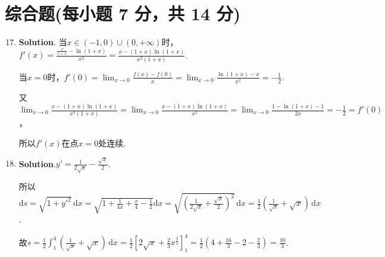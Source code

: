 \documentclass[../Main.tex]{subfiles}
\begin{document}
\section{综合题(每小题 7 分，共 14 分)}
\begin{enumerate}
    \setcounter{enumi}{16}
    \item \textbf{Solution}. 当$x\in(-1,0)\cup(0,+\infty)$时，$f'(x)=\frac{\frac{x}{1+x}-\ln(1+x)}{x^{2}}
              =\frac{x-(1+x)\ln(1+x)}{x^{2}(1+x)}$.

          当$x=0$时，$f'(0)=\lim_{x\to0}\frac{f(x)-f(0)}{x}=\lim_{x\to0}\frac{\ln(1+x)-x}{x^{2}}
              =-\frac{1}{2}$.

          又$\lim_{x\to0}\frac{x-(1+x)\ln(1+x)}{x^{2}(1+x)}=\lim_{x\to0}\frac{x-(1+x)\ln(1+x)}{x^{2}}
              =\lim_{x\to0}\frac{1-\ln(1+x)-1}{2x}=-\frac{1}{2}=f'(0)$，

          所以$f'(x)$在点$x=0$处连续.

    \item \textbf{Solution}.$y'=\frac{1}{2\sqrt{x}}-\frac{\sqrt{x}}{2}$.

          所以$\mathrm{d}s=\sqrt{1+y'^{2}}\,\mathrm{d}x=\sqrt{1+\frac{1}{4x}+\frac{x}{4}-\frac{1}{2}}
              \mathrm{d}x=\sqrt{\left(\frac{1}{2\sqrt{x}}+\frac{\sqrt{x}}{2}\right)^{2}}\,\mathrm{d}
              x=\frac{1}{2}\left(\frac{1}{\sqrt{x}}+\sqrt{x}\right)\,\mathrm{d}x$.

          故$s=\frac{1}{2}\int_{1}^{4}\left(\frac{1}{\sqrt{x}}+\sqrt{x}\right)\,\mathrm{d}
              x=\frac{1}{2}\left[2\sqrt{x}+\frac{2}{3}x^{\frac{3}{2}}\right]_{1}^{4}=\frac{1}{2}
              \left(4+\frac{16}{3}-2-\frac{2}{3}\right)=\frac{10}{3}$.
\end{enumerate}
\end{document}
